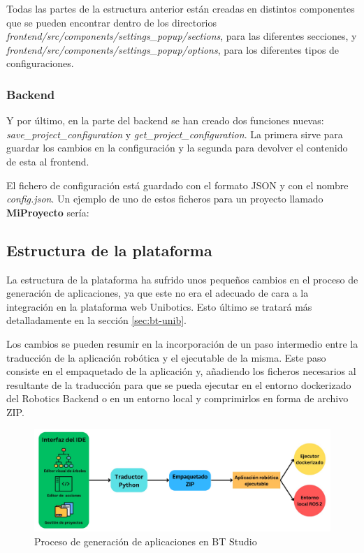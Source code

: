 Todas las partes de la estructura anterior están creadas en distintos componentes que se pueden encontrar dentro de los directorios \textit{frontend/src/components/settings\_popup/sections}, para las diferentes secciones, y \textit{frontend/src/components/settings\_popup/options}, para los diferentes tipos de configuraciones. 

\subsubsection{Backend}

Y por último, en la parte del backend se han creado dos funciones nuevas: \textit{save\_project\_configuration} y \textit{get\_project\_configuration}. La primera sirve para guardar los cambios en la configuración y la segunda para devolver el contenido de esta al frontend.

El fichero de configuración está guardado con el formato JSON y con el nombre \textit{config.json}. Un ejemplo de uno de estos ficheros para un proyecto llamado \textbf{MiProyecto} sería:



\subsection{Estructura de la plataforma}

La estructura de la plataforma ha sufrido unos pequeños cambios en el proceso de generación de aplicaciones, ya que este no era el adecuado de cara a la integración en la plataforma web Unibotics. Esto último se tratará más detalladamente en la sección \ref{sec:bt-unib}.

Los cambios se pueden resumir en la incorporación de un paso intermedio entre la traducción de la aplicación robótica y el ejecutable de la misma. Este paso consiste en el empaquetado de la aplicación y, añadiendo los ficheros necesarios al resultante de la traducción para que se pueda ejecutar en el entorno dockerizado del Robotics Backend o en un entorno local y comprimirlos en forma de archivo ZIP.

\begin{figure}[H]
    \centering
    \includegraphics[width=\textwidth]{figures/bt-avances/flow.png}
    \caption{Proceso de generación de aplicaciones en BT Studio}
    \label{fig:ejemplo-23}
\end{figure}

